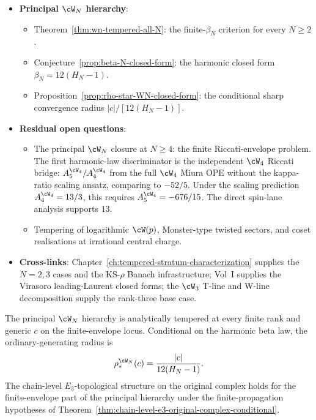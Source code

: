 \begin{itemize}[nosep]
\item \textbf{Principal $\cW_N$ hierarchy}:
 \begin{itemize}[nosep]
 \item Theorem~\ref{thm:wn-tempered-all-N}: the finite-$\beta_N$
 criterion for every $N \ge 2$.
 \item Conjecture~\ref{prop:beta-N-closed-form}: the harmonic
 closed form $\beta_N = 12(H_N - 1)$.
 \item Proposition~\ref{prop:rho-star-WN-closed-form}: the
 conditional sharp convergence radius $|c|/[12(H_N-1)]$.
 \end{itemize}
\item \textbf{Residual open questions}:
 \begin{itemize}[nosep]
 \item The principal $\cW_N$ closure at $N\ge4$: the finite
 Riccati-envelope problem. The first harmonic-law discriminator
 is the independent $\cW_4$ Riccati bridge: $A_5^{\cW_4}/A_4^{\cW_4}$
 from the full $\cW_4$ Miura OPE without the kappa-ratio scaling
 ansatz, comparing to $-52/5$. Under the scaling prediction
 $A_4^{\cW_4}=13/3$, this requires $A_5^{\cW_4}=-676/15$. The
 direct spin-lane analysis supports $13$.
 \item Tempering of logarithmic $\cW(p)$, Monster-type twisted
 sectors, and coset realisations at irrational central charge.
 \end{itemize}
\item \textbf{Cross-links}: Chapter~\ref{ch:tempered-stratum-characterization}
 supplies the $N = 2, 3$ cases and the KS-$\rho$ Banach
 infrastructure; Vol~I supplies the Virasoro leading-Laurent closed
 forms; the $\cW_3$ T-line and W-line decomposition supply the
 rank-three base case.
\end{itemize}

The principal $\cW_N$ hierarchy is analytically tempered at every
finite rank and generic $c$ on the finite-envelope locus. Conditional
on the harmonic beta law, the ordinary-generating radius is
\[
 \rho_*^{\cW_N}(c)=\frac{|c|}{12(H_N-1)}.
\]
The chain-level $E_3$-topological structure on the original complex
holds for the finite-envelope part of the principal hierarchy under
the finite-propagation hypotheses of
Theorem~\ref{thm:chain-level-e3-original-complex-conditional}.


